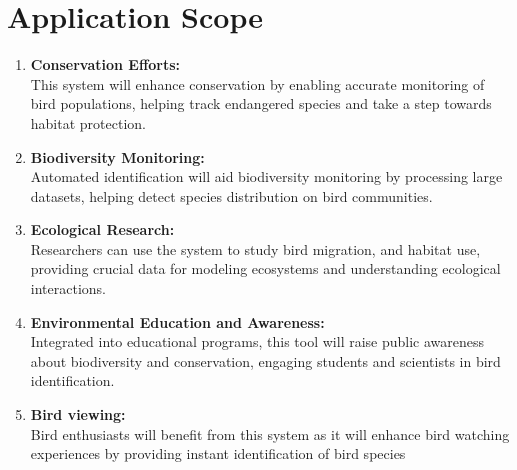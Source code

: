 \section{Application Scope}
\begin{enumerate}
    \item \textbf{Conservation Efforts:}\\This system will enhance conservation by enabling accurate monitoring
          of bird populations, helping track endangered species and take a step towards habitat protection.
    \item \textbf{Biodiversity Monitoring:}\\Automated identification will aid biodiversity monitoring by
          processing large datasets, helping detect species distribution on bird communities.
    \item \textbf{Ecological Research:}\\ Researchers can use the system to study bird migration,
          and habitat use, providing crucial data for modeling ecosystems and understanding ecological interactions.
    \item \textbf{Environmental Education and Awareness:}\\Integrated into educational programs, this tool will
          raise public awareness about biodiversity and conservation, engaging students and scientists in bird identification.
    \item \textbf{Bird viewing:}\\Bird enthusiasts will benefit from this system as it will enhance bird watching 
          experiences by providing instant identification of bird species
\end{enumerate}

